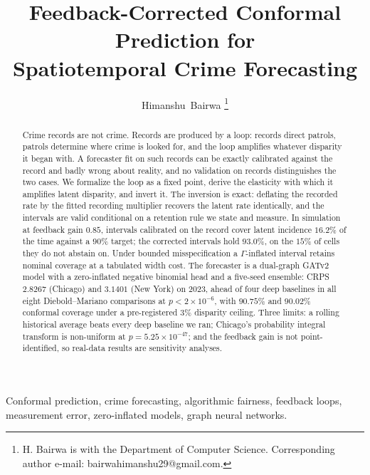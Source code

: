 \documentclass[journal,10pt,twocolumn]{IEEEtran}
\begin{document}
\title{Feedback-Corrected Conformal Prediction for\\ Spatiotemporal Crime Forecasting}

\author{Himanshu~Bairwa%
\thanks{H. Bairwa is with the Department of Computer Science. Corresponding author e-mail: bairwahimanshu29@gmail.com.}%
}

\maketitle

\begin{abstract}
Crime records are not crime. Records are produced by a loop: records direct
patrols, patrols determine where crime is looked for, and the loop amplifies
whatever disparity it began with. A forecaster fit on such records can be
exactly calibrated against the record and badly wrong about reality, and no
validation on records distinguishes the two cases. We formalize the loop as a
fixed point, derive the elasticity with which it amplifies latent disparity, and
invert it. The inversion is exact: deflating the recorded rate by the fitted
recording multiplier recovers the latent rate identically, and the intervals are
valid conditional on a retention rule we state and measure. In simulation at
feedback gain $0.85$, intervals calibrated on the record cover latent incidence
$16.2\%$ of the time against a $90\%$ target; the corrected intervals hold
$93.0\%$, on the $15\%$ of cells they do not abstain on. Under bounded
misspecification a $\Gamma$-inflated interval retains nominal coverage at a
tabulated width cost.
The forecaster is a dual-graph GATv2 model with a zero-inflated negative binomial
head and a five-seed ensemble: CRPS $2.8267$ (Chicago) and $3.1401$ (New York) on
2023, ahead of four deep baselines in all eight Diebold--Mariano comparisons at
$p < 2\times10^{-6}$, with $90.75\%$ and $90.02\%$ conformal coverage under a
pre-registered $3\%$ disparity ceiling. Three limits: a rolling historical average
beats every deep baseline we ran; Chicago's probability integral transform is
non-uniform at $p = 5.25\times10^{-47}$; and the feedback gain is not
point-identified, so real-data results are sensitivity analyses.
\end{abstract}

\begin{IEEEkeywords}
Conformal prediction, crime forecasting, algorithmic fairness, feedback loops,
measurement error, zero-inflated models, graph neural networks.
\end{IEEEkeywords}
\end{document}
